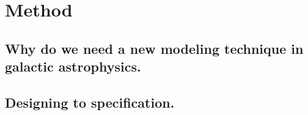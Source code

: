 
\chapter{Method} %
\label{Chapter:Method}

\section{Why do we need a new modeling technique in galactic astrophysics.}
\section{Designing to specification.}
